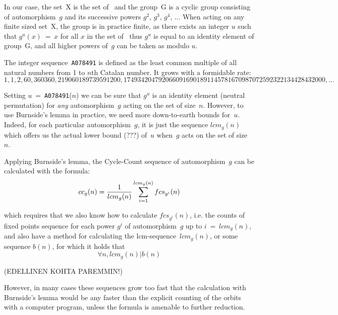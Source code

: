 \documentclass[11pt]{article} %
\newcommand{\eeq}{\end{equation}}
\newcommand{\beql}[1]{\begin{equation}\label{#1}}
\newcommand{\autletter}[1]{$#1$}
\newcommand{\automorphismlet}[1]{automorphism~\autletter{#1}}
\newcommand{\EISseq}[1]{{\tt #1}}
\newcommand{\SET}[1]{{\textsc{#1}}}
\newcommand{\GROUP}[1]{{\textsc{#1}}}
\begin{document}
In our case, the set~\SET{X} is
the set of~{\CatsetN}
and the group~\GROUP{G} is a cyclic group consisting of \automorphismlet{g}
and its successive powers $g^2$, $g^3$, $g^4$, $\hdots$
When acting on any finite sized set~\SET{X},
the group is in practice finite, as there exists an integer $u$ such that
$g^{u}(x)~=~x$ for all $x$ in the set of~{\CatsetN}
thus $g^u$ is equal to an identity element of group~\GROUP{G},
and all higher powers of~\autletter{g} can be taken as modulo $u$.

The integer sequence~\EISseq{A078491}
is defined as the least common multiple of all natural numbers
from 1 to $n$th Catalan number. It grows with a formidable rate:
$$
1, 1, 2, 60, 360360, 219060189739591200,
1749342047920660916901891145781670987072592322134428432000,...
$$

Setting $u$~=~\EISseq{A078491}($n$)
we can be sure that $g^u$ is an identity element (neutral permutation) for
{\em any} \automorphismlet{g} acting on the set of size~$n$.
However, to use Burnside's lemma in practice, we need more down-to-earth
bounds for~$u$. Indeed, for each particular \automorphismlet{g},
it is just the sequence $lcm_{g}(n)$
which offers us the actual lower bound (???) of~$u$ when~$g$
acts on the set of size~$n$.


Applying Burnside's lemma, the Cycle-Count sequence of \automorphismlet{g} can be calculated
with the formula:
\beql{Eq1.1}
cc_{g}(n) = {1\over lcm_{g}(n)} \sum_{i=1}^{lcm_{g}(n)} fcs_{g^i}(n)
\eeq

which requires that we also
know how to calculate $fcs_{g^i}(n)$,
i.e. the counts of fixed points sequence for each power $g^i$ of \automorphismlet{g}
up to $i~=~lcm_{g}(n)$,
and also have a method for calculating the lcm-sequence~$lcm_{g}(n)$,
or some sequence $b(n)$, for which it holds that
$$
\forall n, lcm_{g}(n) | b(n)
$$

(EDELLINEN KOHTA PAREMMIN!)

However, in many cases these sequences grow too fast that the
calculation with Burnside's lemma would be any faster
than the explicit counting of the orbits with a computer program,
unless the formula is amenable to further reduction.




%
%
%
%
\end{document}
